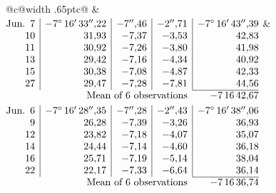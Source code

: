 \noindent\begin{tabular}{@{}c@{\hspace{.4em}\vrule width .65pt\hspace{.4em}}c@{}}
 &
 \\[.18ex]
\(\begin{array}[t]{@{}r|r|r|r|r@{}}
\text{Jun.}\enspace 7 & -7^\circ\,16'\,33''{,}22 & -7''{,}46 & -2''{,}71 & -7^\circ\,16'\,43''{,}39\\
10 & 31{,}93 & -7{,}37 & -3{,}53 & 42{,}83\\
11 & 30{,}92 & -7{,}26 & -3{,}80 & 41{,}98\\
13 & 29{,}42 & -7{,}16 & -4{,}34 & 40{,}92\\
15 & 30{,}38 & -7{,}08 & -4{,}87 & 42{,}33\\
27 & 29{,}47 & -7{,}28 & -7{,}81 & 44{,}56\\
\cline{5-5}
\multicolumn{4}{r}{\text{Mean of 6 observations}} & -7\,16\,42{,}67
\end{array}\)
&
\(\begin{array}[t]{@{}r|r|r|r|r@{}}
\text{Jun.}\enspace 6 & -7^\circ\,16'\,28''{,}35 & -7''{,}28 & -2''{,}43 & -7^\circ\,16'\,38''{,}06\\
9 & 26{,}28 & -7{,}39 & -3{,}26 & 36{,}93\\
12 & 23{,}82 & -7{,}18 & -4{,}07 & 35{,}07\\
14 & 24{,}44 & -7{,}14 & -4{,}60 & 36{,}18\\
16 & 25{,}71 & -7{,}19 & -5{,}14 & 38{,}04\\
22 & 22{,}17 & -7{,}33 & -6{,}64 & 36{,}14\\
\cline{5-5}
\multicolumn{4}{r}{\text{Mean of 6 observations}} & -7\,16\,36{,}74
\end{array}\)
\end{tabular}\par\medskip
{}
